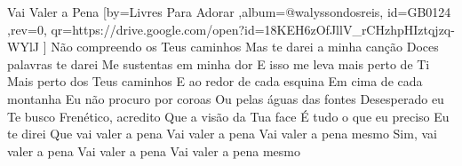 \beginsong
{Vai Valer a Pena %
}[by={Livres Para Adorar %
},album={@walyssondosreis},
id={GB0124 %
},rev={0}, %
qr={https://drive.google.com/open?id=18KEH6zOfJllV_rCHzhpHIztqjzq-WYlJ %
}]
\beginverse*
Não compreendo os Teus caminhos
Mas te darei a minha canção
Doces palavras te darei
Me sustentas em minha dor
E isso me leva mais perto de Ti
Mais perto dos Teus caminhos
\endverse
\beginverse*
E ao redor de cada esquina
Em cima de cada montanha
Eu não procuro por coroas
Ou pelas águas das fontes
Desesperado eu Te busco
Frenético, acredito
Que a visão da Tua face
É tudo o que eu preciso
\endverse
\beginchorus
Eu te direi
Que vai valer a pena
Vai valer a pena
Vai valer a pena mesmo
Sim, vai valer a pena
Vai valer a pena
Vai valer a pena mesmo
\endchorus

